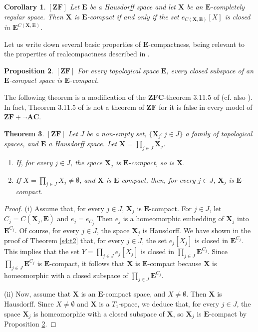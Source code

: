 \documentclass[12pt,twoside,leqno]{article}
\theoremstyle{plain}
\newtheorem{theorem}{Theorem}[section]
\newtheorem{proposition}[theorem]{Proposition}
\newtheorem{corollary}[theorem]{Corollary}
\theoremstyle{definition}
\theoremstyle{remark}
\begin{document}
\begin{corollary}
	\label{s4:c3}
	$[\mathbf{ZF}]$  Let $\mathbf{E}$ be a Hausdorff space and let $\mathbf{X}$ be an $\mathbf{E}$-completely regular space. Then $\mathbf{X}$ is $\mathbf{E}$-compact if and only if the set $e_{C(\mathbf{X}, \mathbf{E})}[X]$ is closed in $\mathbf{E}^{C(\mathbf{X}, \mathbf{E})}$. 
\end{corollary}

Let us write down several basic properties of $\mathbf{E}$-compactness, being relevant to the properties of realcompactness described in \cite[Chapter 3.11]{en}.

\begin{proposition}
	\label{s4:p4}
	$[\mathbf{ZF}]$ For every topological space $\mathbf{E}$, every closed subspace of an $\mathbf{E}$-compact space is $\mathbf{E}$-compact.
\end{proposition}

The following theorem is a modification of the $\mathbf{ZFC}$-theorem 3.11.5 of \cite{en} (cf. also \cite{sh}). In fact, Theorem 3.11.5 of \cite{en} is not a theorem of $\mathbf{ZF}$ for it is false in every model of $\mathbf{ZF}+\neg\mathbf{AC}$.

\begin{theorem}
	\label{s4:t5}
	$[\mathbf{ZF}]$
	Let $J$ be a non-empty set, $\{\mathbf{X}_j: j\in J\}$ a family of topological spaces,  and $\mathbf{E}$ a Hausdorff space. Let $\mathbf{X}=\prod\limits_{j\in J}\mathbf{X}_j$.
	\begin{enumerate}
		\item[(i)] If, for every $j\in J$, the space $\mathbf{X}_j$ is $\mathbf{E}$-compact, so is $\mathbf{X}$.
		\item[(ii)]  If $X=\prod\limits_{j\in J}X_j\neq\emptyset$, and $\mathbf{X}$ is $\mathbf{E}$-compact, then, for every $j\in J$, $\mathbf{X}_j$ is $\mathbf{E}$-compact. 
	\end{enumerate}
\end{theorem}
\begin{proof}
	(i) Assume that, for every $j\in J$, $\mathbf{X}_j$ is $\mathbf{E}$-compact. For $j\in J$, let $C_j=C(\mathbf{X}_j, \mathbf{E})$ and $e_j=e_{C_j}$ Then $e_j$ is a homeomorphic embedding of $\mathbf{X}_j$ into $\mathbf{E}^{C_j}$. Of course, for every $j\in J$, the space $\mathbf{X}_j$ is Hausdorff. We have shown in the proof of Theorem \ref{s4:t2} that, for every $j\in J$, the set $e_j[X_j]$ is closed in $\mathbf{E}^{C_j}$. This implies that the set $Y=\prod\limits_{j\in J}e_j[X_j]$ is closed in $\prod\limits_{j\in J}\mathbf{E}^{C_j}$. Since $\prod\limits_{j\in J}\mathbf{E}^{C_j}$ is $\mathbf{E}$-compact, it follows that $\mathbf{X}$ is $\mathbf{E}$-compact because $\mathbf{X}$ is homeomorphic with a closed subspace of $\prod\limits_{j\in J}\mathbf{E}^{C_j}$.\medskip
	
	(ii) Now, assume that $\mathbf{X}$ is an $\mathbf{E}$-compact space, and $X\neq\emptyset$.  Then $\mathbf{X}$ is Hausdorff. Since $X\neq\emptyset$ and $\mathbf{X}$ is a $T_1$-space, we deduce that, for every $j\in J$, the space $\mathbf{X}_j$ is homeomorphic with a closed subspace of $\mathbf{X}$, so $\mathbf{X}_j$ is $\mathbf{E}$-compact by Proposition \ref{s4:p4}.
\end{proof}
\end{document}
